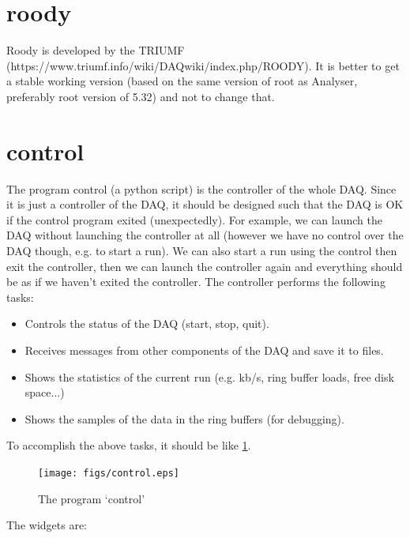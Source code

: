 \documentclass[a4paper,12pt]{article}
\begin{document}
	\section{roody}
	Roody is developed by the TRIUMF
	(https://www.triumf.info/wiki/DAQwiki/index.php/ROODY). It is better to
	get a stable working version (based on the same version of root as
	Analyser, preferably root version of 5.32) and not to change that. 

	\section{control}
	The program control (a python script) is the controller of the whole
	DAQ. Since it is just a controller of the DAQ, it should be designed
	such that the DAQ is OK if the control program exited (unexpectedly).
	For example, we can launch the DAQ without launching the controller at
	all (however we have no control over the DAQ though, e.g. to start a
	run).  We can also start a run using the control then exit the
	controller, then we can launch the controller again and everything
	should be as if we haven't exited the controller. The controller
	performs the following tasks:
	\begin{itemize}
		\item Controls the status of the DAQ (start, stop, quit).
		\item Receives messages from other components of the DAQ and save it
			to files. 
		\item Shows the statistics of the current run (e.g. kb/s, ring buffer
			loads, free disk space...)
		\item Shows the samples of the data in the ring buffers (for
			debugging).
	\end{itemize}
	To accomplish the above tasks, it should be like \ref{fig04}.
	\begin{figure}
		\begin{center}
			\texttt{[image: figs/control.eps]}
			\caption{\label{fig04}The program `control'}
		\end{center}
	\end{figure}
	The widgets are:
\end{document}
